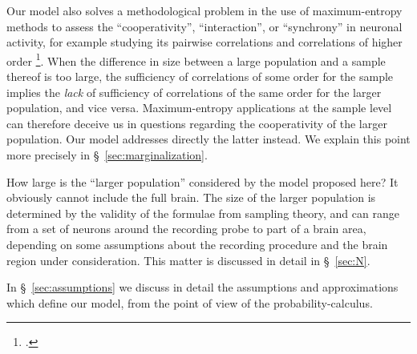 \documentclass[\ifafour a4paper,12pt,\else a5paper,10pt,\fi%
onecolumn,oneside,article,%
british%
]{memoir}
\theoremstyle{remark}
\theoremstyle{innote}
\newcommand*{\citep}{\footcites}
\renewcommand*{\|}{\nonscript\,\vert\nonscript\;\mathopen{}}
\newcommand*{\sect}{\S}%
\newcommand*{\dob}{degree of belief}
\begin{document}
Our model also solves a methodological problem in the use of
maximum-entropy methods to assess the \enquote{cooperativity},
\enquote{interaction}, or \enquote{synchrony} in neuronal activity, for
example studying its pairwise correlations and correlations of higher order
\citep[see for
example][]{martignonetal1995,bohteetal2000,schneidmanetal2006,shlensetal2006,barreiroetal2010,ganmoretal2011,granotatedgietal2013}.
When the difference in size between a large population and a sample thereof
is too large, the sufficiency of correlations of some order for the sample
implies the \emph{lack} of sufficiency of correlations of the same order
for the larger population, and vice versa. Maximum-entropy applications at
the sample level can therefore deceive us in questions regarding the
cooperativity of the larger population. Our model addresses directly the
latter instead. We explain this point more precisely in
\sect~\ref{sec:marginalization}.



How large is the \enquote{larger population} considered by the model
proposed here? It obviously cannot include the full brain. The size of the
larger population is determined by the validity of the formulae from
sampling theory, and can range from a set of neurons around the recording
probe to part of a brain area, depending on some assumptions about the
recording procedure and the brain region under consideration. This matter
is discussed in detail in \sect~\ref{sec:N}.

In \sect~\ref{sec:assumptions} we discuss in detail the assumptions and
approximations which define our model, from the point of view of the
probability-calculus.
\end{document}
